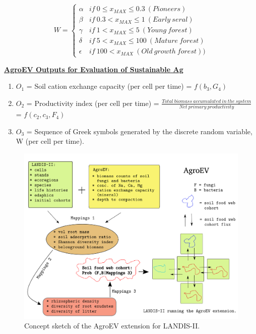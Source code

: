 \[ W = \begin{cases} 
      \alpha  & if \ 0\leq x_{MAX} \leq 0.3  \ (Pioneers) \\
      \beta  & if \ 0.3 < x_{MAX} \leq 1 \ (Early \ seral) \\
      \gamma  & if \ 1 < x_{MAX} \leq 5 \ (Young \ forest)\\
      \delta & if \ 5 < x_{MAX} \leq 100  \  (Mature \ forest)\\
      \epsilon & if \ 100 < x_{MAX}  \ (Old \ growth \ forest))
   \end{cases}
\]

\vspace{5 mm}

\noindent \textbf{\underline{AgroEV Outputs for Evaluation of Sustainable Ag }}\\
\begin{enumerate}
  \item $O_1$ = Soil cation exchange capacity (per cell per time) = $f(b_3, G_4)$
  \item $O_2$ = Productivity index (per cell per time) = $ \frac{Total \ biomass \ accumulated \ in \ the \ system}{Net \ primary \ productivity}$ = $ f(c_2, c_3, F_4)$
  \item $O_3$ = Sequence of Greek symbols generated by the discrete random variable, W  (per cell per time).
\end{enumerate}



\begin{figure}
  \begin{center}
    \includegraphics[scale = 0.60]{Ch4_AgroEV/graphics/AgroEV_doc.png}
    \caption{Concept sketch of the AgroEV extension for LANDIS-II.}
    \label{fig:}
  \end{center}
\end{figure}

